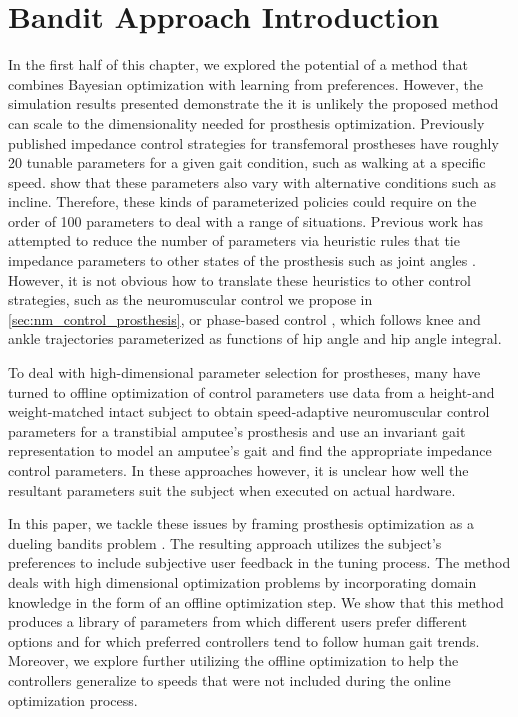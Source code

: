 \section{Bandit Approach Introduction} 

In the first half of this chapter, we explored the potential of a method that
combines Bayesian optimization with learning from preferences. However, the
simulation results presented demonstrate the it is unlikely the proposed method
can scale to the dimensionality needed for prosthesis optimization. Previously
published impedance control strategies for transfemoral prostheses have roughly
20 tunable parameters for a given gait condition, such as walking at a specific
speed. \citet{sup2011upslope} show that these parameters also vary with
alternative conditions such as incline.  Therefore, these kinds of parameterized
policies could require on the order of 100 parameters to deal with a range of
situations. Previous work has attempted to reduce the number of parameters via
heuristic rules that tie impedance parameters to other states of the prosthesis
such as joint angles \citep{simon2014configuring}.  However, it is not obvious
how to translate these heuristics to other control strategies, such as the
neuromuscular control we propose in \cref{sec:nm_control_prosthesis}, or
phase-based control \citep{quintero2016preliminary}, which follows knee and
ankle trajectories parameterized as functions of hip angle and hip angle
integral.

To deal with high-dimensional parameter selection for prostheses, many have
turned to offline optimization of control parameters \citet{markowitz2011speed}
use data from a height-and weight-matched intact subject to obtain
speed-adaptive neuromuscular control parameters for a transtibial amputee's
prosthesis and \citet{aghasadeghi2013learning} use an invariant gait
representation to model an amputee's gait and find the appropriate impedance
control parameters. In these approaches however, it is unclear how well the
resultant parameters suit the subject when executed on actual hardware.

In this paper, we tackle these issues by framing prosthesis optimization as a
dueling bandits problem \citep{yue2012k}. The resulting approach utilizes the
subject's preferences to include subjective user feedback in the tuning process.
The method deals with high dimensional optimization problems by incorporating
domain knowledge in the form of an offline optimization step. We show that this
method produces a library of parameters from which different users prefer
different options and for which preferred controllers tend to follow human gait
trends. Moreover, we explore further utilizing the offline optimization to help
the controllers generalize to speeds that were not included during the online
optimization process.
